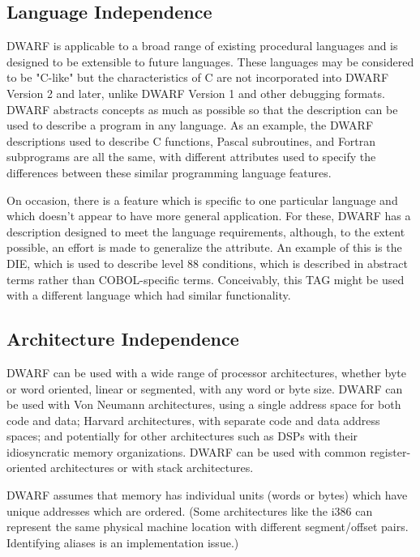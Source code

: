 \subsection{Language Independence}
DWARF is applicable to a broad range of existing procedural languages and is designed to be extensible to future languages.  These languages may be considered to be "C-like" but the characteristics of C are not incorporated into DWARF Version 2 and later, unlike DWARF Version 1 and other debugging formats.  DWARF abstracts concepts as much as possible so that the description can be used to describe a program in any language. As an example, the DWARF descriptions used to describe C functions, Pascal subroutines, and Fortran subprograms are all the same, with different attributes used to specify the differences between these similar programming language features. 

On occasion, there is a feature which is specific to one particular language and which doesn't appear to have more general application.  For these, DWARF has a description designed to meet the language requirements, although, to the extent possible, an effort is made to generalize the attribute. An example of this is the \DWTAGconditionNAME{} DIE, which is used to describe  level 88 conditions, which is described in abstract terms rather than COBOL-specific terms.  Conceivably, this TAG might be used with a different language which had similar functionality. 

\subsection{Architecture Independence}
DWARF can be used with a wide range of processor architectures, whether byte or word oriented, linear or segmented, with any word or byte size.  DWARF can be used with Von Neumann architectures, using a single address space for both code and data; Harvard architectures, with 
separate code and data address spaces; and potentially for other architectures such as DSPs with their idiosyncratic memory organizations.  DWARF can be used with common register-oriented architectures or with stack architectures. 

DWARF assumes that memory has individual units (words or bytes) which have unique addresses which are ordered.  (Some architectures like the i386 can represent the same physical machine location with different segment/offset pairs.  Identifying aliases is an implementation issue.)

